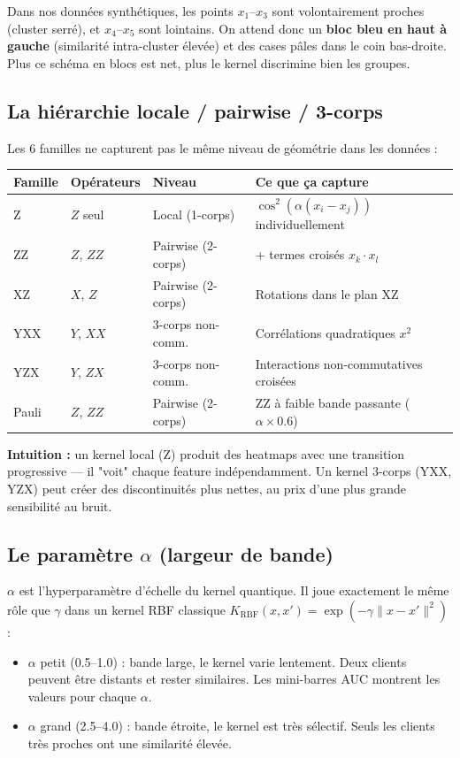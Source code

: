 \documentclass[12pt, a4paper]{article}
\begin{document}
Dans nos données synthétiques, les points $x_1$--$x_3$ sont volontairement proches (cluster serré),
et $x_4$--$x_5$ sont lointains. On attend donc un \textbf{bloc bleu en haut à gauche}
(similarité intra-cluster élevée) et des cases pâles dans le coin bas-droite.
Plus ce schéma en blocs est net, plus le kernel discrimine bien les groupes.

\subsection*{La hiérarchie locale / pairwise / 3-corps}

Les 6 familles ne capturent pas le même niveau de géométrie dans les données :

\begin{center}
\begin{tabular}{llll}
  \toprule
  \textbf{Famille} & \textbf{Opérateurs} & \textbf{Niveau} & \textbf{Ce que ça capture} \\
  \midrule
  Z     & $Z$ seul         & Local (1-corps)         & $\cos^2(\alpha(x_i - x_j))$ individuellement \\
  ZZ    & $Z$, $ZZ$        & Pairwise (2-corps)      & + termes croisés $x_k \cdot x_l$ \\
  XZ    & $X$, $Z$         & Pairwise (2-corps)      & Rotations dans le plan XZ \\
  YXX   & $Y$, $XX$        & 3-corps non-comm.       & Corrélations quadratiques $x^2$ \\
  YZX   & $Y$, $ZX$        & 3-corps non-comm.       & Interactions non-commutatives croisées \\
  Pauli & $Z$, $ZZ$        & Pairwise (2-corps)      & ZZ à faible bande passante ($\alpha \times 0.6$) \\
  \bottomrule
\end{tabular}
\end{center}

\textbf{Intuition :} un kernel local (Z) produit des heatmaps avec une transition progressive
— il "voit" chaque feature indépendamment. Un kernel 3-corps (YXX, YZX) peut créer des
discontinuités plus nettes, au prix d'une plus grande sensibilité au bruit.

\subsection*{Le paramètre $\alpha$ (largeur de bande)}

$\alpha$ est l'hyperparamètre d'échelle du kernel quantique.
Il joue exactement le même rôle que $\gamma$ dans un kernel RBF classique
$K_{\text{RBF}}(x, x') = \exp(-\gamma \|x-x'\|^2)$ :
\begin{itemize}
  \item $\alpha$ petit (0.5--1.0) : bande large, le kernel varie lentement.
        Deux clients peuvent être distants et rester similaires.
        Les mini-barres AUC montrent les valeurs pour chaque $\alpha$.
  \item $\alpha$ grand (2.5--4.0) : bande étroite, le kernel est très sélectif.
        Seuls les clients très proches ont une similarité élevée.
\end{itemize}
\end{document}
